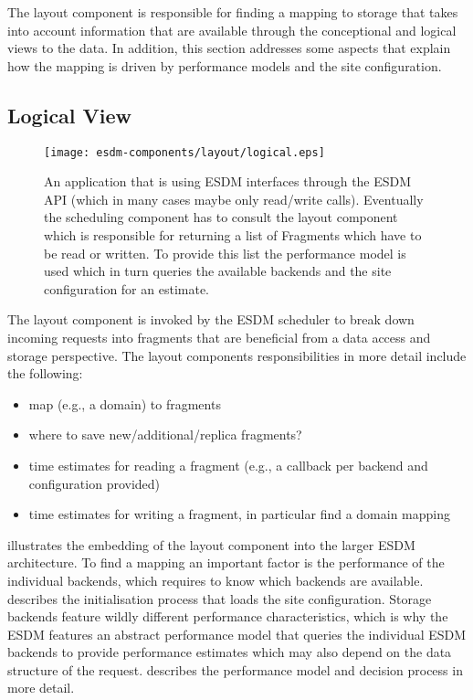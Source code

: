 
The layout component is responsible for finding a mapping to storage that takes into account information that are available through the conceptional and logical views to the data.
In addition, this section addresses some aspects that explain how the mapping is driven by performance models and the site configuration.


\subsection{Logical View}

\begin{figure}
	\centering
	\texttt{[image: esdm-components/layout/logical.eps]}
	\caption{An application that is using ESDM interfaces through the ESDM API (which in many cases maybe only read/write calls). Eventually the scheduling component has to consult the layout component which is responsible for returning a list of Fragments which have to be read or written. To provide this list the performance model is used which in turn queries the available backends and the site configuration for an estimate.}
	\label{fig:esdm layout logical view}
\end{figure}

The layout component is invoked by the ESDM scheduler to break down incoming requests into fragments that are beneficial from a data access and storage perspective.
The layout components responsibilities in more detail include the following:

\begin{itemize}
	\item map (e.g., a domain) to fragments
	\item where to save new/additional/replica fragments?
	\item time estimates for reading a fragment (e.g., a callback per backend and configuration provided)
	\item time estimates for writing a fragment, in particular find a domain mapping
\end{itemize}

 illustrates the embedding of the layout component into the larger ESDM architecture.
To find a mapping an important factor is the performance of the individual backends, which requires to know which backends are available.
 describes the initialisation process that loads the site configuration.
Storage backends feature wildly different performance characteristics, which is why the ESDM features an abstract performance model that queries the individual ESDM backends to provide performance estimates which may also depend on the data structure of the request.
 describes the performance model and decision process in more detail.

